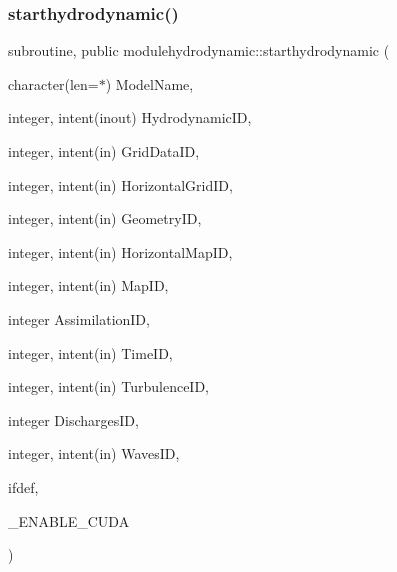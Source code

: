\mbox{\label{namespacemodulehydrodynamic_a5f577b4eaf3f21452c288af53dcffb69}} 
\subsubsection{\texorpdfstring{starthydrodynamic()}{starthydrodynamic()}}
{\footnotesize\ttfamily subroutine, public modulehydrodynamic\+::starthydrodynamic (\begin{DoxyParamCaption}\item[{character(len=$\ast$)}]{Model\+Name,  }\item[{integer, intent(inout)}]{Hydrodynamic\+ID,  }\item[{integer, intent(in)}]{Grid\+Data\+ID,  }\item[{integer, intent(in)}]{Horizontal\+Grid\+ID,  }\item[{integer, intent(in)}]{Geometry\+ID,  }\item[{integer, intent(in)}]{Horizontal\+Map\+ID,  }\item[{integer, intent(in)}]{Map\+ID,  }\item[{integer}]{Assimilation\+ID,  }\item[{integer, intent(in)}]{Time\+ID,  }\item[{integer, intent(in)}]{Turbulence\+ID,  }\item[{integer}]{Discharges\+ID,  }\item[{integer, intent(in)}]{Waves\+ID,  }\item[{}]{ifdef,  }\item[{}]{\+\_\+\+E\+N\+A\+B\+L\+E\+\_\+\+C\+U\+DA }\end{DoxyParamCaption})}

